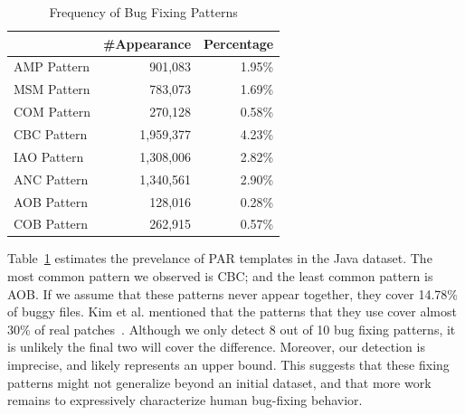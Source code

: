 \documentclass{sig-alternate-05-2015}
\begin{document}
\begin{table}[!htb]
	\centering
	\begin{tabular}{lrr} 
		\hline
		& \textbf{\#Appearance} & \textbf{Percentage}\\
		\hline
		AMP Pattern & 901,083 & 1.95\%\\
		MSM Pattern & 783,073 & 1.69\%\\
		COM Pattern & 270,128 & 0.58\%\\ 
		CBC Pattern & 1,959,377 & 4.23\%\\  
		IAO Pattern & 1,308,006 & 2.82\%\\  
		ANC Pattern & 1,340,561 & 2.90\%\\  
		AOB Pattern & 128,016 & 0.28\%\\  
		COB Pattern & 262,915 & 0.57\%\\   
		\hline
	\end{tabular}
	\caption{Frequency of Bug Fixing Patterns}\label{tab:freqpattern}
	
\end{table}



Table~\ref{tab:freqpattern} estimates the prevelance of PAR templates in the
Java dataset. The most common pattern we observed is CBC; and the least common
pattern is AOB. If we assume that these patterns never appear together, they
cover 14.78\% of buggy files. Kim et al. mentioned that the patterns that they
use cover almost 30\% of real patches~\cite{kim2013}. Although we only detect 8
out of 10 bug fixing patterns, it is unlikely the final two will cover the
difference. Moreover, our detection is imprecise, and likely represents an upper
bound.  This suggests that these fixing patterns might not generalize
beyond an initial dataset, and that more work remains to expressively characterize human bug-fixing behavior.
\end{document}
